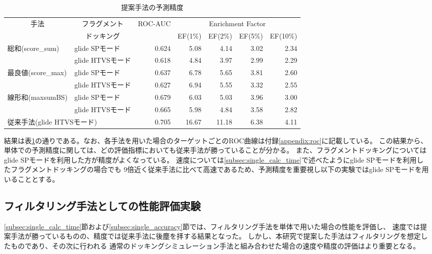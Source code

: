 \begin{table}[htb] \centering
	\caption{提案手法の予測精度}
	\label{table:single_accuracy}
	\begin{tabular}{l|l|rrrrr}
	\hline
	\multicolumn{1}{c|}{\multirow{2}{*}{手法}}	&\multicolumn{1}{c|}{フラグメント}		&\multirow{2}{*}{ROC-AUC}	&\multicolumn{4}{c}{Enrichment Factor}	\\
										&\multicolumn{1}{c|}{ドッキング}		&						&EF(1\%)	&EF(2\%)	&EF(5\%)	&EF(10\%)	\\ \hline
	\multirow{2}{*}{総和(score\_sum)}			&glide SPモード					&0.624					&5.08	&4.14	&3.02	&2.34		\\
										&glide HTVSモード					&0.618					&4.84	&3.97	&2.99	&2.29		\\
	\multirow{2}{*}{最良値(score\_max)}		&glide SPモード					&0.637					&6.78	&5.65	&3.81	&2.60		\\
										&glide HTVSモード					&0.627					&6.94	&5.55	&3.32	&2.55		\\
	\multirow{2}{*}{線形和(maxsumBS)}		&glide SPモード					&0.679					&6.03	&5.03	&3.96	&3.00		\\
										&glide HTVSモード					&0.665					&5.98	&4.84	&3.58	&2.82		\\ \hline
	\multicolumn{2}{l|}{従来手法(glide HTVSモード)}								&0.705					&16.67	&11.18	&6.38	&4.11		\\ \hline
	\end{tabular}
\end{table}

結果は表\ref{table:single_accuracy}の通りである。なお、各手法を用いた場合のターゲットごとのROC曲線は付録\ref{appendix:roc}に記載している。
この結果から、単体での予測精度に関しては、どの評価指標においても従来手法が勝っていることが分かる。
また、フラグメントドッキングについてはglide SPモードを利用した方が精度がよくなっている。
速度については\ref{subsec:single_calc_time}で述べたようにglide SPモードを利用したフラグメントドッキングの場合でも
9倍近く従来手法に比べて高速であるため、予測精度を重要視し以下の実験ではglide SPモードを用いることとする。

\subsection{フィルタリング手法としての性能評価実験}
\ref{subsec:single_calc_time}節および\ref{subsec:single_accuracy}節では、フィルタリング手法を単体で用いた場合の性能を評価し、
速度では提案手法が勝っているものの、精度では従来手法に後塵を拝する結果となった。
しかし、本研究で提案した手法はフィルタリングを想定したものであり、その次に行われる
通常のドッキングシミュレーション手法と組み合わせた場合の速度や精度の評価はより重要となる。


